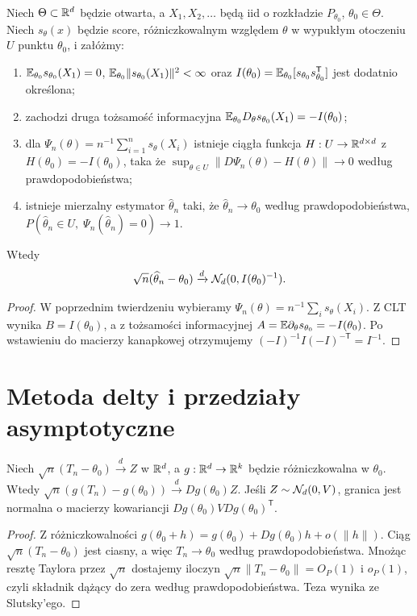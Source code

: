 \begin{wniosek}
\label{cor:mle-asymptotic}
Niech $\Theta\subset\mathbb R^d$ będzie otwarta, a
$X_1,X_2,\ldots$ będą iid o rozkładzie $P_{\theta_0}$,
$\theta_0\in\Theta$. Niech $s_\theta(x)$ będzie score,
różniczkowalnym względem $\theta$ w wypukłym otoczeniu
$U$ punktu $\theta_0$, i załóżmy:
\begin{enumerate}
\item $\mathbb E_{\theta_0}s_{\theta_0}(X_1)=0$,
$\mathbb E_{\theta_0}\|s_{\theta_0}(X_1)\|^2<\infty$ oraz
$I(\theta_0)=\mathbb E_{\theta_0}[s_{\theta_0}s_{\theta_0}^{\mathsf T}]$
jest dodatnio określona;
\item zachodzi druga tożsamość informacyjna
$\mathbb E_{\theta_0}D_\theta s_{\theta_0}(X_1)=-I(\theta_0)$;
\item dla $\Psi_n(\theta)=n^{-1}\sum_{i=1}^n s_\theta(X_i)$
istnieje ciągła funkcja $H:U\to\mathbb R^{d\times d}$ z
$H(\theta_0)=-I(\theta_0)$, taka że
$\sup_{\theta\in U}\|D\Psi_n(\theta)-H(\theta)\|\to0$
według prawdopodobieństwa;
\item istnieje mierzalny estymator $\widehat\theta_n$ taki,
że $\widehat\theta_n\to\theta_0$ według prawdopodobieństwa,
$P(\widehat\theta_n\in U,\;\Psi_n(\widehat\theta_n)=0)\to1$.
\end{enumerate}
Wtedy
\[
\sqrt n(\widehat\theta_n-\theta_0)
\xrightarrow{d}\mathcal N_d(0,I(\theta_0)^{-1}).
\]
\end{wniosek}
\begin{proof}
W poprzednim twierdzeniu wybieramy $\Psi_n(\theta)=
n^{-1}\sum_i s_\theta(X_i)$. Z CLT wynika $B=I(\theta_0)$,
a z tożsamości informacyjnej
$A=\mathbb E\partial_\theta s_{\theta_0}=-I(\theta_0)$.
Po wstawieniu do macierzy kanapkowej otrzymujemy
$(-I)^{-1}I(-I)^{-\mathsf T}=I^{-1}$.
\end{proof}

\section{Metoda delty i przedziały asymptotyczne}
\begin{twierdzenie}
Niech $\sqrt n(T_n-\theta_0)\xrightarrow{d}Z$ w $\mathbb R^d$,
a $g:\mathbb R^d\to\mathbb R^k$ będzie różniczkowalna w $\theta_0$.
Wtedy
$\sqrt n(g(T_n)-g(\theta_0))\xrightarrow{d}Dg(\theta_0)Z$.
Jeśli $Z\sim\mathcal N_d(0,V)$, granica jest normalna o macierzy
kowariancji $Dg(\theta_0)V Dg(\theta_0)^{\mathsf T}$.
\end{twierdzenie}
\begin{proof}
Z różniczkowalności
$g(\theta_0+h)=g(\theta_0)+Dg(\theta_0)h+o(\|h\|)$.
Ciąg $\sqrt n(T_n-\theta_0)$ jest ciasny, a więc
$T_n\to\theta_0$ według prawdopodobieństwa.
Mnożąc resztę Taylora przez $\sqrt n$ dostajemy iloczyn
$\sqrt n\|T_n-\theta_0\|=O_P(1)$ i
$o_P(1)$, czyli składnik dążący do zera według
prawdopodobieństwa. Teza wynika ze Slutsky'ego.
\end{proof}

